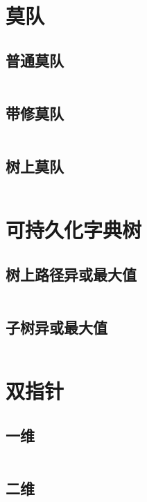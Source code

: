 \documentclass[a4paper,11pt]{article}
\begin{document}
\section*{莫队}
\subsection*{普通莫队}
\inputminted[]{c++}{Template/Segment/bzoj2038.cpp}
\subsection*{带修莫队}
\inputminted[]{c++}{Template/Segment/bzoj2120.cpp}
\subsection*{树上莫队}
\inputminted[]{c++}{Template/Segment/luoguP4074.cpp}
\section*{可持久化字典树}
\subsection*{树上路径异或最大值}
\inputminted[]{c++}{Template/Segment/PersistibleTrieI.cpp}
\subsection*{子树异或最大值}
\inputminted[]{c++}{Template/Segment/PersistibleTrieII.cpp}




\newpage
\section*{双指针}
\subsection*{一维}
\inputminted[]{c++}{Template/Other/TwoPointer.cpp}
\subsection*{二维}
\inputminted[]{c++}{Template/Other/TwoDimTwoPointer.cpp}
\end{document}
